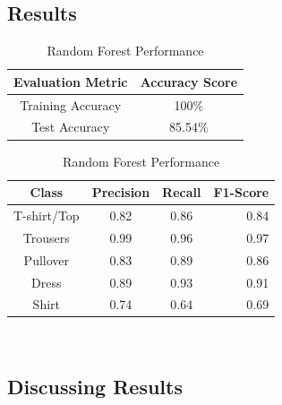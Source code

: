 \subsection{Results}\label{subsec:results}
\begin{table}[!ht]
\begin{subtable}[c]{0.4\textwidth}
\footnotesize
\centering
\begin{tabular}{ c | c }
 \toprule
 Evaluation Metric & Accuracy Score  \\
 \midrule
 Training Accuracy &  100\% \\
 Test Accuracy &85.54\% \\
 \bottomrule
\end{tabular}
\captionsetup{justification=centering,margin=1cm}
\end{subtable}
\begin{subtable}[c]{0.6\textwidth}
\footnotesize
\centering
\begin{tabular}{c | c c r}
Class & Precision & Recall & F1-Score\\
\midrule
T-shirt/Top   &    0.82  &    0.86  &    0.84 \\
Trousers   &    0.99  &    0.96  &    0.97 \\
Pullover   &    0.83  &    0.89  &    0.86\\
Dress   &    0.89  &    0.93  &    0.91\\
Shirt   &    0.74  &    0.64  &    0.69\\
\end{tabular}
\captionsetup{justification=centering,margin=1cm}
\end{subtable}
\caption{Random Forest Performance}
\label{tab:random_forest_evaluation}
\end{table}\\

\subsection{Discussing Results}